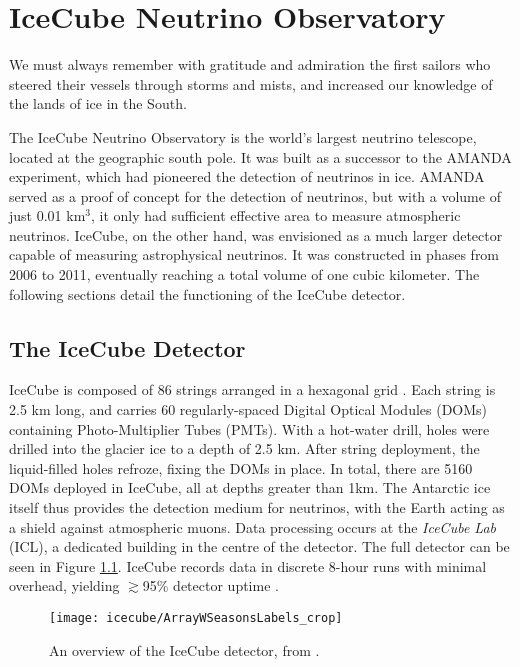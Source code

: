 \setchapterpreamble[u]{\margintoc}
\chapter{IceCube Neutrino Observatory}
\begin{fquote} We must always remember with gratitude and admiration the first sailors who steered their vessels through storms and mists, and increased our knowledge of the lands of ice in the South. 
\end{fquote}
The IceCube Neutrino Observatory is the world's largest neutrino telescope, located at the geographic south pole. It was built as a successor to the AMANDA experiment, which had pioneered the detection of neutrinos in ice. AMANDA served as a proof of concept for the detection of neutrinos, but with a volume of just 0.01 km$^{3}$, it only had sufficient effective area to measure atmospheric neutrinos. IceCube, on the other hand, was envisioned as a much larger detector capable of measuring astrophysical neutrinos. It was constructed in phases from 2006 to 2011, eventually reaching a total volume of one cubic kilometer. The following sections detail the functioning of the IceCube detector.

\section{The IceCube Detector}

IceCube is composed of 86 strings arranged in a hexagonal grid . Each string is 2.5 km long, and carries 60 regularly-spaced Digital Optical Modules (DOMs) containing Photo-Multiplier Tubes (PMTs). With a hot-water drill, holes were drilled into the glacier ice to a depth of 2.5 km. After string deployment, the liquid-filled holes refroze, fixing the DOMs in place. In total, there are 5160 DOMs deployed in IceCube, all at depths greater than 1km. The Antarctic ice itself thus provides the detection medium for neutrinos, with the Earth acting as a shield against atmospheric muons. Data processing occurs at the \emph{IceCube Lab} (ICL), a dedicated building in the centre of the detector. The full detector can be seen in Figure \ref{fig:ic_detector}. IceCube records data in discrete 8-hour runs with minimal overhead, yielding $\gtrsim$95\% detector uptime \cite{icecube_detector_17}.

\begin{figure}
	\centering \texttt{[image: icecube/ArrayWSeasonsLabels\_crop]}
	\caption{An overview of the IceCube detector, from \cite{icecube_detector_17}.}
	\label{fig:ic_detector}
\end{figure}

